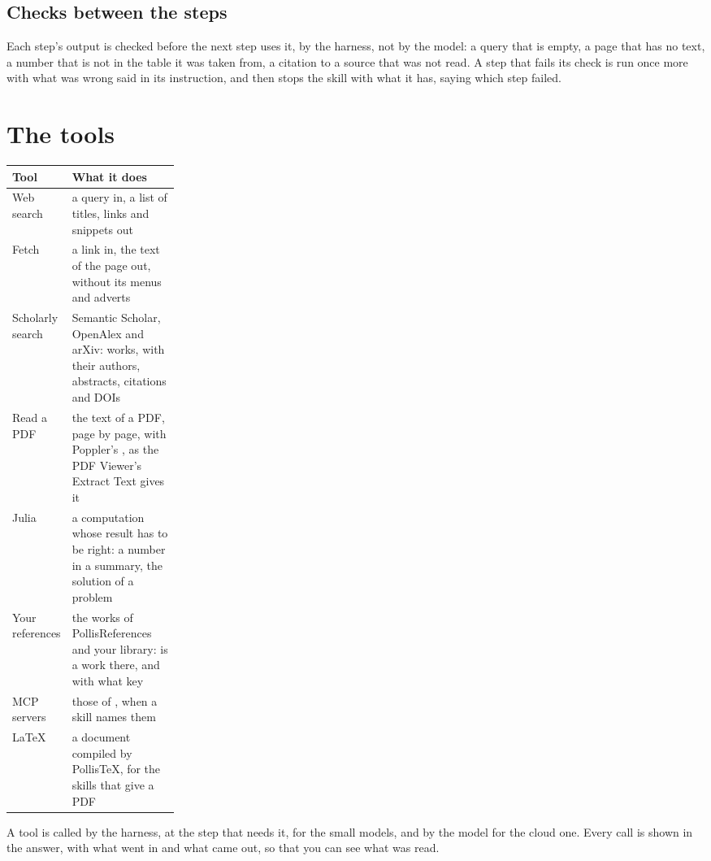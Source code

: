 \subsection{Checks between the steps}
Each step's output is checked before the next step uses it, by the harness, not by the model: a query that is empty,
a page that has no text, a number that is not in the table it was taken from, a citation to a source that was not
read. A step that fails its check is run once more with what was wrong said in its instruction, and then stops the
skill with what it has, saying which step failed.

\section{The tools}\label{sec:tools}

\begin{center}\small
\renewcommand{\arraystretch}{1.25}
\begin{tabularx}{\linewidth}{@{}p{0.24\linewidth}L@{}}
\toprule
\textbf{Tool} & \textbf{What it does}\\
\midrule
Web search & a query in, a list of titles, links and snippets out\\
Fetch & a link in, the text of the page out, without its menus and adverts\\
Scholarly search & Semantic Scholar, OpenAlex and arXiv: works, with their authors, abstracts, citations and DOIs\\
Read a PDF & the text of a PDF, page by page, with Poppler's , as the PDF Viewer's Extract Text gives it\\
Julia & a computation whose result has to be right: a number in a summary, the solution of a problem\\
Your references & the works of PollisReferences and your library: is a work there, and with what key\\
MCP servers & those of , when a skill names them\\
LaTeX & a document compiled by PollisTeX, for the skills that give a PDF\\
\bottomrule
\end{tabularx}
\end{center}

A tool is called by the harness, at the step that needs it, for the small models, and by the model for the cloud one.
Every call is shown in the answer, with what went in and what came out, so that you can see what was read.

